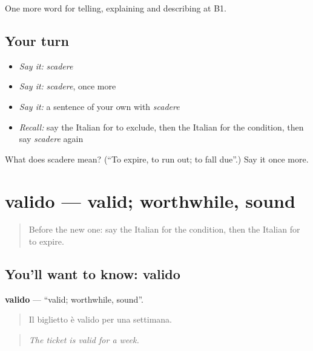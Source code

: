 \begin{grammarlens}[title={What you've built}]
One more word for telling, explaining and describing at B1.
\end{grammarlens}

\subsection*{Your turn}
\begin{itemize}
\raggedright
  \item \emph{Say it:} \emph{scadere}
  \item \emph{Say it:} \emph{scadere}, once more
  \item \emph{Say it:} a sentence of your own with \emph{scadere}
  \item \emph{Recall:} say the Italian for to exclude, then the Italian for the condition, then say \emph{scadere} again
\end{itemize}

\begin{tcolorbox}[breakable,colback=teal!4,colframe=teal!35!black,title={Before you move on}]
What does scadere mean? (\textquotedblleft{}To expire, to run out; to fall due\textquotedblright{}.) Say it once more.
\end{tcolorbox}
\section[valido]{valido — valid; worthwhile, sound}

\label{lesson:IT-C388-valido}



\begin{quote}
Before the new one: say the Italian for the condition, then the Italian for to expire.
\end{quote}

\subsection*{You'll want to know: valido}
\textbf{valido} — \textquotedblleft{}valid; worthwhile, sound\textquotedblright{}.

\begin{quote}
Il biglietto è valido per una settimana.
\end{quote}

\begin{quote}
\emph{The ticket is valid for a week.}
\end{quote}


